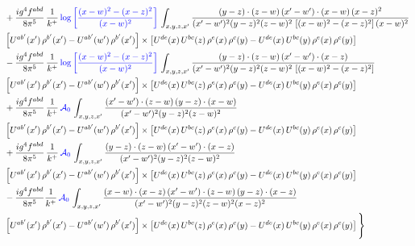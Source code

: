 \documentclass[10pt]{article}
\numberwithin{equation}{section}
\newcommand{\new}[1]{{\color{blue}#1}}
\begin{document}
\begin{align}
& +\frac{ig^{4}f^{abd}}{8\pi^{5}}\,\frac{1}{k^{+}}\,\new{\log{\left[\frac{(x-w)^{2}-(x-z)^{2}}{(x-w)^{2}}\right]}}\,\int_{x,y,z,x'}
\frac{(y-z)\cdot(z-w)\,(x'-w')\cdot(x-w)\,(x-z)^{2}}{(x'-w')^{2}(y-z)^{2}(z-w)^{2}\,\left[(x-w)^{2}-(x-z)^{2}\right](x-w)^{2}}\notag \\ 
& \left[U^{ab'}(x')\,\rho^{b'}(x')-U^{ab'}(w')\, \rho^{b'}(x')\right]\times \left[U^{de}(x)\,U^{bc}(z)\, \rho^{e}(x)\,\rho^{c}(y)-U^{de}(x)\,U^{bc}(y)\,\rho^{e}(x)\,\rho^{c}(y)\right] \notag \\
& -\frac{ig^{4}f^{abd}}{8\pi^{5}}\,\frac{1}{k^{+}}\,\new{\log{\left[\frac{(x-w)^{2}-(x-z)^{2}}{(x-w)^{2}}\right]}}\,\int_{x,y,z,x'}
\frac{(y-z)\cdot(z-w)\,(x'-w')\cdot(x-z)}{(x'-w')^{2}(y-z)^{2}(z-w)^{2}\,\left[(x-w)^{2}-(x-z)^{2}\right]}\notag \\ & \left[U^{ab'}(x')\,\rho^{b'}(x')-U^{ab'}(w')\, \rho^{b'}(x')\right]\times \left[U^{de}(x)\,U^{bc}(z)\, \rho^{e}(x)\,\rho^{c}(y)-U^{de}(x)\,U^{bc}(y)\,\rho^{e}(x)\,\rho^{c}(y)\right] \notag \\
& +\frac{ig^{4}f^{abd}}{8\pi^{5}}\,\frac{1}{k^{+}}\,\new{\mathcal{A}_{0}}\,\int_{x,y,z,x'}
\frac{(x'-w')\cdot(z-w)\,(y-z)\cdot(x-w)}{(x'-w')^{2}(y-z)^{2}(z-w)^{2}}\notag \\
& \left[U^{ab'}(x')\,\rho^{b'}(x')-U^{ab'}(w')\, \rho^{b'}(x')\right]\times \left[U^{de}(x)\,U^{bc}(z)\, \rho^{e}(x)\,\rho^{c}(y)-U^{de}(x)\,U^{bc}(y)\,\rho^{e}(x)\,\rho^{c}(y)\right] \notag \\
& +\frac{ig^{4}f^{abd}}{8\pi^{5}}\,\frac{1}{k^{+}}\,\new{\mathcal{A}_{0}}\,\int_{x,y,z,x'}
\frac{(y-z)\cdot(z-w)\,(x'-w')\cdot(x-z)}{(x'-w')^{2}(y-z)^{2}(z-w)^{2}}\notag \\ & \left[U^{ab'}(x')\,\rho^{b'}(x')-U^{ab'}(w')\, \rho^{b'}(x')\right]\times \left[U^{de}(x)\,U^{bc}(z)\, \rho^{e}(x)\,\rho^{c}(y)-U^{de}(x)\,U^{bc}(y)\,\rho^{e}(x)\,\rho^{c}(y)\right] \notag \\
& -\frac{ig^{4}f^{abd}}{8\pi^{5}}\frac{1}{k^{+}}\,\new{\mathcal{A}_{0}}\,\int_{x,y,z,x'}
\frac{(x-w)\cdot(x-z)\,(x'-w')\cdot(z-w)\,(y-z)\cdot(x-z)}{(x'-w')^{2}(y-z)^{2}(z-w)^{2}(x-z)^{2}}\notag \\ & \left[U^{ab'}(x')\,\rho^{b'}(x')-U^{ab'}(w')\, \rho^{b'}(x')\right]\times \left[U^{de}(x)\,U^{bc}(z)\, \rho^{e}(x)\,\rho^{c}(y)-U^{de}(x)\,U^{bc}(y)\,\rho^{e}(x)\,\rho^{c}(y)\right]\Bigg\} \label{eq:F:G1IIIN3a}
\end{align}
\end{document}
